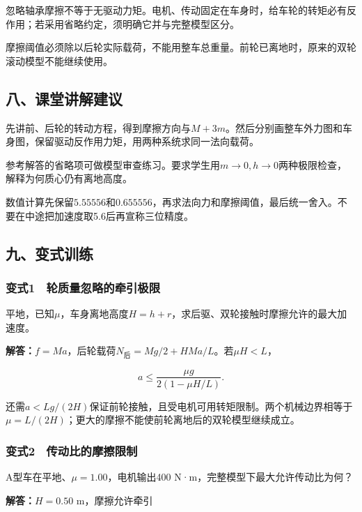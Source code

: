\documentclass[12pt,a4paper,fontset=fandol]{ctexart}
\begin{document}
忽略轴承摩擦不等于无驱动力矩。电机、传动固定在车身时，给车轮的转矩必有反作用；若采用省略约定，须明确它并与完整模型区分。

摩擦阈值必须除以后轮实际载荷，不能用整车总重量。前轮已离地时，原来的双轮滚动模型不能继续使用。

\subsection{八、课堂讲解建议}\label{ux516bux8bfeux5802ux8bb2ux89e3ux5efaux8bae-6}

先讲前、后轮的转动方程，得到摩擦方向与\(M+3m\)。然后分别画整车外力图和车身图，保留驱动反作用力矩，用两种系统求同一法向载荷。

参考解答的省略项可做模型审查练习。要求学生用\(m\to0,h\to0\)两种极限检查，解释为何质心仍有离地高度。

数值计算先保留\(5.55556\)和\(0.655556\)，再求法向力和摩擦阈值，最后统一舍入。不要在中途把加速度取5.6后再宣称三位精度。

\subsection{九、变式训练}\label{ux4e5dux53d8ux5f0fux8badux7ec3-6}

\subsubsection{变式1　轮质量忽略的牵引极限}\label{ux53d8ux5f0f1-ux8f6eux8d28ux91cfux5ffdux7565ux7684ux7275ux5f15ux6781ux9650}

平地，已知\(\mu\)，车身离地高度\(H=h+r\)，求后驱、双轮接触时摩擦允许的最大加速度。

\textbf{解答：}\(f=Ma\)，后轮载荷\(N_{\text{后}}=Mg/2+HMa/L\)。若\(\mu H<L\)，

\[
a\leq\frac{\mu g}{2(1-\mu H/L)}.
\]

还需\(a<Lg/(2H)\)保证前轮接触，且受电机可用转矩限制。两个机械边界相等于\(\mu=L/(2H)\)；更大的摩擦不能使前轮离地后的双轮模型继续成立。

\subsubsection{变式2　传动比的摩擦限制}\label{ux53d8ux5f0f2-ux4f20ux52a8ux6bd4ux7684ux6469ux64e6ux9650ux5236}

A型车在平地、\(\mu=1.00\)，电机输出400
N·m，完整模型下最大允许传动比为何？

\textbf{解答：}\(H=0.50\) m，摩擦允许牵引
\end{document}
